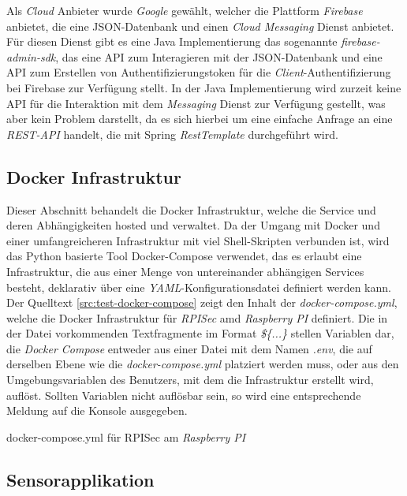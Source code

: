 \documentclass[]{article}
\newcommand{\dockerRPIDir}{../host/docker}
\newenvironment{code}{\captionsetup{type=listing}}{}
\begin{document}
\newline
\newline
Als \emph{Cloud} Anbieter wurde \emph{Google} gewählt, welcher die Plattform \emph{Firebase} anbietet, die eine JSON-Datenbank und einen \emph{Cloud Messaging} Dienst anbietet. Für diesen Dienst gibt es eine Java Implementierung das sogenannte \emph{firebase-admin-sdk}, das eine API zum Interagieren mit der JSON-Datenbank und eine API zum Erstellen von Authentifizierungstoken für die \emph{Client}-Authentifizierung bei Firebase zur Verfügung stellt. In der Java Implementierung wird zurzeit keine API für die Interaktion mit dem \emph{Messaging} Dienst zur Verfügung gestellt, was aber kein Problem darstellt, da es sich hierbei um eine einfache Anfrage an eine \emph{REST-API} handelt, die mit Spring \emph{RestTemplate} durchgeführt wird.

\subsection{Docker Infrastruktur}
Dieser Abschnitt behandelt die Docker Infrastruktur, welche die Service und deren Abhängigkeiten hosted und verwaltet. Da der Umgang mit Docker und einer umfangreicheren Infrastruktur mit viel Shell-Skripten verbunden ist, wird das Python basierte Tool Docker-Compose verwendet, das es erlaubt eine Infrastruktur, die aus einer Menge von untereinander abhängigen Services besteht, deklarativ über eine \emph{YAML}-Konfigurationsdatei definiert werden kann. 
\newline
\newline
Der Quelltext \ref{src:test-docker-compose} zeigt den Inhalt der \emph{docker-compose.yml}, welche die Docker Infrastruktur für \emph{RPISec} amd \emph{Raspberry PI} definiert. Die in der Datei vorkommenden Textfragmente im Format \emph{\$\{...\}} stellen Variablen dar, die \emph{Docker Compose} entweder aus einer Datei mit dem Namen \emph{.env}, die auf derselben Ebene wie die \emph{docker-compose.yml} platziert werden muss, oder aus den Umgebungsvariablen des Benutzers, mit dem die Infrastruktur erstellt wird, auflöst. Sollten Variablen nicht auflösbar sein, so wird eine entsprechende Meldung auf die Konsole ausgegeben.
\begin{code}
	\caption{docker-compose.yml für RPISec am \emph{Raspberry PI}}
	\yamlFile{\dockerRPIDir/docker-compose.yml}
	\label{src:test-docker-compose}
\end{code}

\subsection{Sensorapplikation}
\label{sec:sensor-application}
\end{document}
